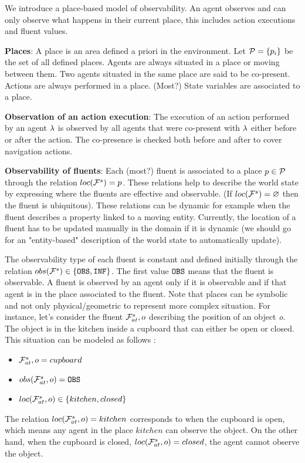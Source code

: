 \documentclass[letterpaper]{article} %
\begin{document}
We introduce a place-based model of observability. An agent observes and can only observe what happens in their current place, this includes action executions and fluent values.

\textbf{Places}: 
A place is an area defined a priori in the environment. Let $\mathcal{P}=\{ p_i \}$ be the set of all defined places. Agents are always situated in a place or moving between them. Two agents situated in the same place are said to be co-present. Actions are always performed in a place. (Most?) State variables are associated to a place.

\textbf{Observation of an action execution}: 
The execution of an action performed by an agent $\lambda$ is observed by all agents that were co-present with $\lambda$ either before or after the action. The co-presence is checked both before and after to cover navigation actions.

\textbf{Observability of fluents}:
Each (most?) fluent is associated to a place $p \in \mathcal{P}$ through the relation $loc( \mathcal{F}^{s}_{}{} )=p$. These relations help to describe the world state by expressing where the fluents are effective and observable. (If $loc( \mathcal{F}^{s}_{}{} ) = \varnothing $ then the fluent is ubiquitous). These relations can be dynamic for example when the fluent describes a property linked to a moving entity. Currently, the location of a fluent has to be updated manually in the domain if it is dynamic (we should go for an "entity-based" description of the world state to automatically update).

The observability type of each fluent is constant and defined initially through the relation $obs( \mathcal{F}^{s}_{}{} ) \in \{ \texttt{OBS}, \texttt{INF} \}$. 
The first value $\texttt{OBS}$ means that the fluent is observable. A fluent is observed by an agent only if it is observable and if that agent is in the place associated to the fluent. 
Note that places can be symbolic and not only physical/geometric to represent more complex situation. For instance, let's consider the fluent $\mathcal{F}^{s}_{at}{,o}$ describing the position of an object \textit{o}. The object is in the kitchen inside a cupboard that can either be open or closed. This situation can be modeled as follows :
\begin{itemize}
    \item $\mathcal{F}^{s}_{at}{,o}=cupboard$
    \item $obs( \mathcal{F}^{s}_{at}{,o} )=\texttt{OBS}$
    \item $loc( \mathcal{F}^{s}_{at}{,o} ) \in \{ kitchen, closed \}$
\end{itemize}
The relation $loc( \mathcal{F}^{s}_{at}{,o} ) = kitchen$ corresponds to when the cupboard is open, which means any agent in the place $kitchen$ can observe the object. On the other hand, when the cupboard is closed, $loc( \mathcal{F}^{s}_{at}{,o} ) = closed$, the agent cannot observe the object.
\end{document}
